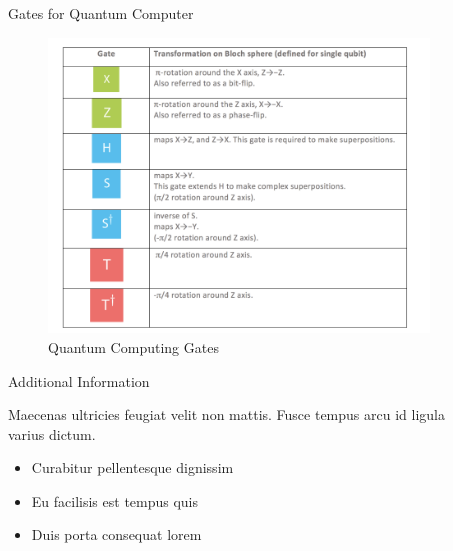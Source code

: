 \documentclass[final]{beamer}
\newlength{\sepwid}
\newlength{\onecolwid}
\newlength{\twocolwid}
\begin{document}
\begin{frame}[t]
\begin{columns}[t]
\begin{column}{\twocolwid}
\end{column} %

\begin{column}{\sepwid}\end{column} %

\begin{column}{\onecolwid} %


\begin{block}{Gates for Quantum Computer}

\begin{figure}
    \includegraphics[width=0.8\linewidth]{gates.png}
    \caption{Quantum Computing Gates}
    \end{figure}
    

\end{block}


\begin{block}{Additional Information}

Maecenas ultricies feugiat velit non mattis. Fusce tempus arcu id ligula varius dictum. 
\begin{itemize}
\item Curabitur pellentesque dignissim
\item Eu facilisis est tempus quis
\item Duis porta consequat lorem
\end{itemize}


\end{block}
\end{column}
\end{columns}
\end{frame}
\end{document}
